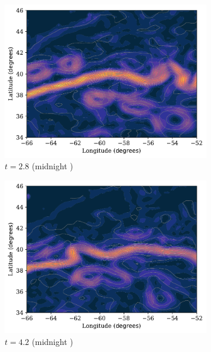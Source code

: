 \begin{figure}
\begin{center}
\begin{subfigure}{0.49\textwidth}
			\includegraphics[width=\textwidth]{chp02_background/figures/gulf_stream_motivation/streamlines_2.pdf}
			\caption{\(t = 2.8\) (midnight )}
		\end{subfigure}
		\begin{subfigure}{0.49\textwidth}
			\includegraphics[width=\textwidth]{chp02_background/figures/gulf_stream_motivation/streamlines_3.pdf}
			\caption{\(t = 4.2\) (midnight )}
		\end{subfigure}
		\begin{subfigure}{0.49\textwidth}

\end{subfigure}
\end{center}
\end{figure}
